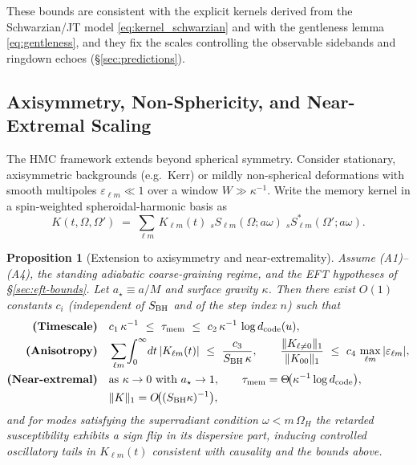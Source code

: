 \documentclass[a4paper,11pt]{article}
\newcommand{\HMC}{\textup{\textsc{HMC}}\xspace}
\theoremstyle{plain}
\newtheorem{proposition}{Proposition}
\theoremstyle{definition}
\theoremstyle{remark}
\begin{document}
These bounds are consistent with the explicit kernels derived from the Schwarzian/JT model \eqref{eq:kernel_schwarzian} and with the
gentleness lemma \eqref{eq:gentleness}, and they fix the scales controlling the observable sidebands and ringdown echoes
(\S\ref{sec:predictions}).

\subsection{Axisymmetry, Non-Sphericity, and Near-Extremal Scaling} %
\label{sec:axisymmetry}
The \HMC{} framework extends beyond spherical symmetry. Consider stationary, axisymmetric backgrounds (e.g.~Kerr) or mildly
non-spherical deformations with smooth multipoles $\varepsilon_{\ell m}\ll 1$ over a window $W\gg \kappa^{-1}$.
Write the memory kernel in a spin-weighted spheroidal-harmonic basis as
\begin{equation}
K(t,\Omega,\Omega') \;=\; \sum_{\ell m}\,K_{\ell m}(t)\;{}_{s}S_{\ell m}(\Omega;a\omega)\;{}_{s}S^{\ast}_{\ell m}(\Omega';a\omega).\label{eq:kernel_anisotropic}
\end{equation}
\begin{proposition}[Extension to axisymmetry and near-extremality]\label{prop:axisymmetry}
Assume (A1)--(A4), the standing adiabatic coarse-graining regime, and the EFT hypotheses of \S\ref{sec:eft-bounds}. Let $a_\star\equiv a/M$ and surface gravity $\kappa$.
Then there exist $O(1)$ constants $c_i$ (independent of $S_{\rm BH}$ and of the step index $n$) such that
\begin{align}
\textbf{(Timescale)}\quad& c_1\,\kappa^{-1}\ \le\ \tau_{\rm mem}\ \le\ c_2\,\kappa^{-1}\,\log d_{\rm code}(u),\label{eq:axis_timescale}\\
\textbf{(Anisotropy)}\quad& \sum_{\ell m}\!\int_0^\infty\!dt\,|K_{\ell m}(t)|\ \le\ \frac{c_3}{S_{\rm BH}\,\kappa},\qquad
\frac{\|K_{\ell\neq 0}\|_1}{\|K_{00}\|_1}\ \le\ c_4\,\max_{\ell m}|\varepsilon_{\ell m}|,\label{eq:axis_anisotropy}\\
\textbf{(Near-extremal)}\quad& \text{as }\kappa\to 0 \text{ with } a_\star\to 1,\qquad
\tau_{\rm mem} = \Theta\!\big(\kappa^{-1}\log d_{\rm code}\big),\nonumber\\
& \|K\|_1 = O\!\big((S_{\rm BH}\kappa)^{-1}\big),\label{eq:axis_extremal}
\end{align}
and for modes satisfying the superradiant condition $\omega<m\,\Omega_H$ the retarded susceptibility exhibits a sign flip in its dispersive part, inducing
controlled oscillatory tails in $K_{\ell m}(t)$ consistent with causality and the bounds above.
\end{proposition}
\end{document}
